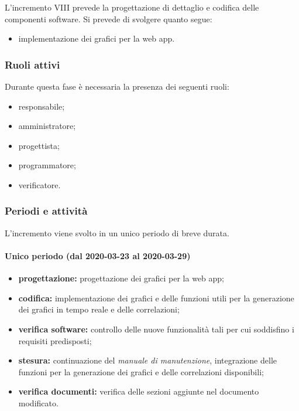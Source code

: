 			L'incremento VIII prevede la progettazione di dettaglio e codifica delle componenti software. Si prevede di svolgere quanto segue:
			\begin{itemize}
				\item implementazione dei grafici per la web app.
			\end{itemize}
			
			\subsubsection{Ruoli attivi}
			
				Durante questa fase è necessaria la presenza dei seguenti ruoli:
				\begin{itemize}
					\item responsabile;
					\item amministratore;
					\item progettista;
					\item programmatore;
					\item verificatore.
				\end{itemize}
			
			\subsubsection{Periodi e attività}
			
				L'incremento viene svolto in un unico periodo di breve durata.
				
				\paragraph{Unico periodo (dal 2020-03-23 al 2020-03-29)}
				
					\begin{itemize}
						\item \textbf{progettazione:} progettazione dei grafici per la web app;
						\item \textbf{codifica:} implementazione dei grafici e delle funzioni utili per la generazione dei grafici in tempo reale e delle correlazioni;
						\item \textbf{verifica software:} controllo delle nuove funzionalità tali per cui soddisfino i requisiti predisposti;
						\item \textbf{stesura:} continuazione del \textit{manuale di manutenzione}, integrazione delle funzioni per la generazione dei grafici e delle correlazioni disponibili;
						\item \textbf{verifica documenti:} verifica delle sezioni aggiunte nel documento modificato.
					\end{itemize} 			

